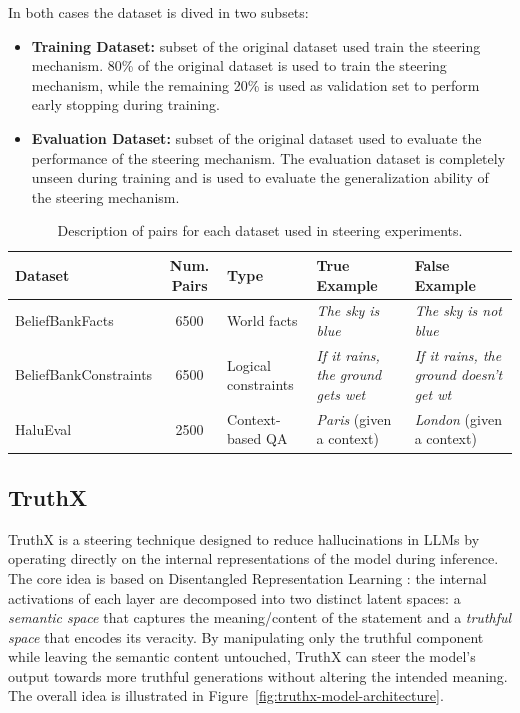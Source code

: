 In both cases the dataset is dived in two subsets:
\begin{itemize}
\item \textbf{Training Dataset:} subset of the original dataset used train the steering mechanism. 80\% of the original dataset is used to train the steering mechanism, while the remaining 20\% is used as validation set to perform early stopping during training.
\item \textbf{Evaluation Dataset:} subset of the original dataset used to evaluate the performance of the steering mechanism. The evaluation dataset is completely unseen during training and is used to evaluate the generalization ability of the steering mechanism.
\end{itemize}

\begin{table}[h]
\centering
\scriptsize
\begin{tabularx}{\textwidth}{XcXXX}
\toprule
\textbf{Dataset} & \textbf{Num. Pairs} & \textbf{Type} & \textbf{True Example} & \textbf{False Example} \\
\midrule
BeliefBankFacts & 6500 & World facts & 
    \textit{The sky is blue} & 
    \textit{The sky is not blue} \\[0.5em]
BeliefBankConstraints & 6500 & Logical constraints & 
    \textit{If it rains, the ground gets wet} & 
    \textit{If it rains, the ground doesn't get wt} \\[0.5em]
HaluEval & 2500 & Context-based QA & 
    \textit{Paris} (given a context) & 
    \textit{London} (given a context) \\
\bottomrule
\end{tabularx}
\caption{Description of pairs for each dataset used in steering experiments.}
\label{tab:datasets-pairs}
\end{table}


\subsection{TruthX}

TruthX is a steering technique designed to reduce hallucinations in LLMs by operating directly on the internal representations of the model during inference. The core idea is based on Disentangled Representation Learning \cite{DisentangledRepresentationLearning}: the internal activations of each layer are decomposed into two distinct latent spaces: a \textit{semantic space} that captures the meaning/content of the statement and a \textit{truthful space} that encodes its veracity. By manipulating only the truthful component while leaving the semantic content untouched, TruthX can steer the model's output towards more truthful generations without altering the intended meaning. The overall idea is illustrated in Figure~\ref{fig:truthx-model-architecture}.

